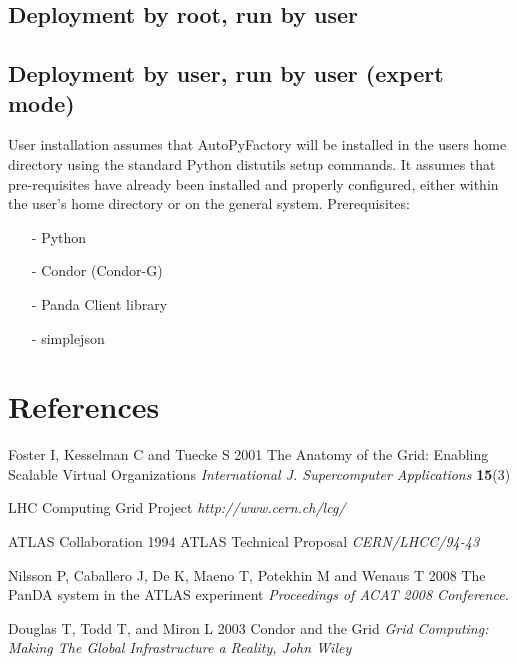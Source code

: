 \documentclass[a4paper]{jpconf}
\begin{document}
\subsection{Deployment by root, run by user}

\subsection{Deployment by user, run by user (expert mode)}

User installation assumes that AutoPyFactory will be installed in the users home directory using the standard Python distutils setup commands. 
It assumes that pre-requisites have already been installed and properly configured,
either within the user's home directory or on the general system.
Prerequisites: 

\begin{enumerate}
\item[-] Python 
\item[-] Condor (Condor-G) 
\item[-] Panda Client library 
\item[-] simplejson
\end{enumerate}


\section*{References}
\begin{thebibliography}{99}

\item Foster I, Kesselman C and Tuecke S 2001 The Anatomy of the Grid: Enabling Scalable Virtual Organizations
      {\it International J. Supercomputer Applications} {\bf 15}(3)

\item LHC Computing Grid Project
      {\it http://www.cern.ch/lcg/}

\item ATLAS Collaboration 1994 ATLAS Technical Proposal 
      {\it CERN/LHCC/94-43} 

\item Nilsson P, Caballero J, De K, Maeno T, Potekhin M and Wenaus T 2008 The PanDA system in the ATLAS experiment
      {\it Proceedings of ACAT 2008 Conference.}

\item Douglas T, Todd T, and Miron L 2003 Condor and the Grid
      {\it Grid Computing: Making The Global Infrastructure a Reality, John Wiley}

\end{thebibliography}
\end{document}
